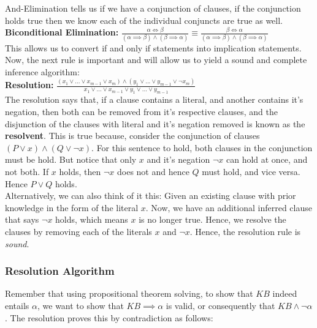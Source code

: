 \documentclass[12pt]{article}
\begin{document}
And-Elimination tells us if we have a conjunction of clauses, if the conjunction holds true then we know each of the individual conjuncts are true as well.\\

\textbf{Biconditional Elimination:} $\frac{\alpha \iff \beta}{(\alpha \implies \beta) \land (\beta \implies \alpha)} \equiv \frac{\beta \iff \alpha}{(\alpha \implies \beta) \land (\beta \implies \alpha)}$\\

This allows us to convert if and only if statements into implication statements. Now, the next rule is important and will allow us to yield a sound and complete inference algorithm:\\

\textbf{Resolution:} $\frac{(x_1 \lor ... \lor x_{m-1} \lor x_m)\land(y_1 \lor ... \lor y_{m-1} \lor \lnot x_m)}{x_1 \lor ... \lor x_{m-1} \lor y_1 \lor ... \lor y_{m-1}}$\\

The resolution says that, if a clause contains a literal, and another contains it's negation, then both can be removed from it's respective clauses, and the disjunction of the clauses with literal and it's negation removed is known as the \textbf{resolvent}. This is true because, consider the conjunction of clauses $(P \lor x) \land (Q \lor \lnot x)$. For this sentence to hold, both clauses in the conjunction must be hold. But notice that only $x$ and it's negation $\lnot x$ can hold at once, and not both. If $x$ holds, then $\lnot x$ does not and hence $Q$ must hold, and vice versa. Hence $P \lor Q$ holds.\\

Alternatively, we can also think of it this: Given an existing clause with prior knowledge in the form of the literal $x$. Now, we have an additional inferred clause that says $\lnot x$ holds, which means $x$ is no longer true. Hence, we resolve the clauses by removing each of the literals $x$ and $\lnot x$. Hence, the resolution rule is \textit{sound}.\\

\subsubsection{Resolution Algorithm}

Remember that using propositional theorem solving, to show that $KB$ indeed entails $\alpha$, we want to show that $KB \implies \alpha$ is valid, or consequently that $KB \land \lnot \alpha$. The resolution proves this by contradiction as follows:
\end{document}
